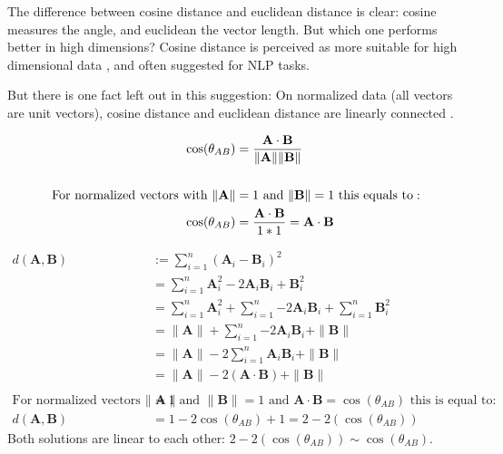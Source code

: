 		The difference between cosine distance and euclidean distance is clear: cosine measures the angle, and euclidean the vector length. But which one performs better in high dimensions? Cosine distance is perceived as more suitable for high dimensional data \cite[ch.~6.2]{40algorithms}, and often suggested for \ac{NLP} tasks. 
		
		But there is one fact left out in this suggestion: On normalized data (all vectors are unit vectors), cosine distance and euclidean distance are linearly connected \cite{khanRelationshipCosineSimilarity2020}.
		
		\begin{align*}
			\cos(\theta_{AB}) &= {\mathbf{A} \cdot \mathbf{B} \over \|\mathbf{A}\| \|\mathbf{B}\|}  \\
			\\
			\text{For normalized vectors with } \|\mathbf{A}\| &=1 \text{ and } \|\mathbf{B}\| =1 \text{ this equals to}: \\
			\cos(\theta_{AB}) &=  {\mathbf{A} \cdot \mathbf{B} \over 1 * 1 } = \mathbf{A} \cdot \mathbf{B}
		\end{align*}
		
		\begin{align*}
			d(\mathbf{A}, \mathbf{B}) &:=  \sum\limits_{i=1}^{n}{(\mathbf{A}_i -  \mathbf{B}_i)^{2}} \\
			&= \sum\limits_{i=1}^{n}{\mathbf{A}_i^{2} - 2\mathbf{A}_i\mathbf{B}_i + \mathbf{B}_i^2}  \\ 
			&= \sum\limits_{i=1}^{n}{\mathbf{A}_i^{2}} + \sum\limits_{i=1}^{n}{- 2\mathbf{A}_i\mathbf{B}_i} + \sum\limits_{i=1}^{n}{\mathbf{B}_i^2} \\
			&= 	\|\mathbf{A}\| + \sum\limits_{i=1}^{n}{- 2\mathbf{A}_i\mathbf{B}_i} + \|\mathbf{B}\| \\
			&= \|\mathbf{A}\| -2 \sum\limits_{i=1}^{n}{\mathbf{A}_i\mathbf{B}_i} + \|\mathbf{B}\| \\
			&= \|\mathbf{A}\| -2 (\mathbf{A} \cdot \mathbf{B}) + \|\mathbf{B}\| \\
			\\
			\text{For normalized vectors with }\|\mathbf{A}\| &=1 \text{ and } \|\mathbf{B}\| =1  \text{ and } \mathbf{A} \cdot \mathbf{B}  = \cos(\theta_{AB}) \text{ this is equal to}:\\
			d(\mathbf{A}, \mathbf{B}) &= 1 - 2 \cos(\theta_{AB}) + 1 = 2 - 2(\cos(\theta_{AB}))
		\end{align*}
		Both solutions are linear to each other: $2 - 2(\cos(\theta_{AB})) \sim \cos(\theta_{AB})$.
	
